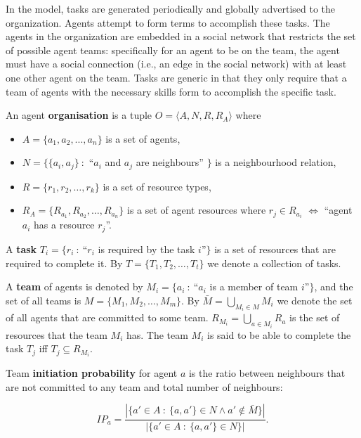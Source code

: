 \documentclass{llncs}
\begin{document}
In the model, tasks are generated periodically and globally advertised to the organization. Agents attempt to form terms to accomplish these tasks. The agents in the organization are embedded in a social network that restricts the set of possible agent teams: specifically for an agent to be on the team, the agent must have a social connection (i.e., an edge in the social network) with at least one other agent on the team. Tasks are generic in that they only require that a team of agents with the necessary skills form to accomplish the specific task.

\begin{definition}
An agent \textbf{organisation} is a tuple $O=\langle A, N, R, R_A  \rangle$ where
\noindent
\begin{itemize}
\item $A= \{ a_1,a_2,...,a_n \} $ is a set of agents,
\item $N=\{\{a_i,a_j \}\ :$ ``$a_i$ and $a_j$ are neighbours'' $\}$ is a neighbourhood relation,
\item $R=\{r_1,r_2,\dots,r_k\}$ is a set of resource types,
\item $R_A=\{R_{a_1}, R_{a_2}, \dots, R_{a_n}\}$ is a set of agent resources where $r_j \in R_{a_i} $ $\iff$ ``agent $a_i$ has a resource $r_j$''.
\end{itemize}
\end{definition}

\begin{definition}
A \textbf{task} $T_i=\{r_i\ :\ $``$r_i$ is required by the task $i$''$\}$ is a set of resources that are required to complete it. By $T=\{T_1, T_2,\dots, T_t\}$ we denote a collection of tasks.
\end{definition}

\begin{definition}
A \textbf{team} of agents is denoted by $M_i=\{a_i\ :\ $``$a_i$ is a member of team $i$''$\}$, and the set of all teams is $M=\{M_1, M_2,\dots , M_m\}$. By $\bar{M} = \bigcup_{M_i \in M} M_i$ we denote the set of all agents that are committed to some team. $R_{M_i}=\bigcup_{a \in M_i}R_{a}$ is the set of resources that the team $M_i$ has. The team $M_i$ is said to be able to complete the task $T_j$ iff $T_j \subseteq R_{M_i}$.
\end{definition}

\begin{definition}
Team \textbf{initiation probability} for agent $a$ is the ratio between neighbours that are not committed to any team and total number of neighbours:

\begin{equation}
IP_a = \frac{|\{ a' \in A\ :\ \{a, a'\} \in N \wedge a' \notin \bar{M}  \}|}{|\{ a' \in A\ :\ \{a, a'\} \in N \}|}.
\label{eq:init_prob}
\end{equation}

\end{definition}
\end{document}
